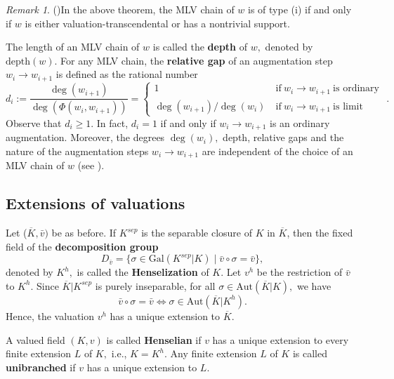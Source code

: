 \documentclass[11pt]{amsart}
\theoremstyle{definition}
\theoremstyle{remark}
\newtheorem{remark}[theorem]{Remark}
\numberwithin{equation}{section}
\begin{document}
\begin{remark}(\cite[Lemma 4.5]{EN1})\label{mlvtl}
	In the above theorem, the MLV chain of $w$ is of type (i)  if and only if $w$ is either valuation-transcendental or has a nontrivial support.
\end{remark}

The length of an MLV chain of $w$ is called the {\bf depth} of $w,$ denoted by $\text{depth}(w).$ For any MLV chain, the {\bf relative gap} of an augmentation step $w_{i}\longrightarrow w_{i+1}$ is defined as the rational number
\[d_{i}:=\frac{\deg(w_{i+1})}{\deg(\Phi(w_{i},w_{i+1}))}= \begin{cases} 1 & \text{if} \ w_{i}\longrightarrow w_{i+1}\ \text{is ordinary }\\ \deg(w_{i+1})/\deg(w_{i})\ &  \text{if} \ w_{i}\longrightarrow w_{i+1} \ \text{is limit }\end{cases} .\] Observe that $d_i\geq 1.$ In fact, $d_i=1$ if and only if $w_{i}\longrightarrow w_{i+1}$ is an ordinary augmentation. Moreover, the degrees $\deg (w_i),$ depth, relative gaps and the nature of the augmentation steps $w_{i}\longrightarrow w_{i+1}$ are independent of the choice of an MLV chain of $w$ (see \cite[Corollary 4.4, Theorem 4.7]{EN1}). 


\subsection{Extensions of valuations}

Let ($\overline{K},\bar{v})$ be as before. If $K^{sep}$ is the separable closure of $K$ in $\overline{K}$, then the fixed field of the {\bf decomposition group}\[D_{\bar{v}}=\{\sigma\in \text{Gal}(K^{sep}|K)\mid\bar{v}\circ\sigma=\bar{v}\},\] denoted by $K^h,$ is called the {\bf Henselization} of $K.$ Let $v^h$ be the restriction of $\bar{v}$ to $K^h.$ Since $\overline{K}|K^{sep}$ is purely inseparable, for all $\sigma\in \text{Aut}(\overline{K}|K),$ we have \[\bar{v}\circ\sigma=\bar{v}\iff \sigma\in \text{Aut}(\overline{K}|K^h).\] Hence, the valuation $v^h$ has a unique extension to $\overline{K}.$

A valued field $(K,v)$ is called {\bf Henselian} if $v$ has a unique extension to every finite extension $L$ of $K,$ i.e., $K=K^h.$ Any finite extension $L$ of $K$ is called {\bf unibranched} if $v$ has a unique extension to $L.$
\end{document}
